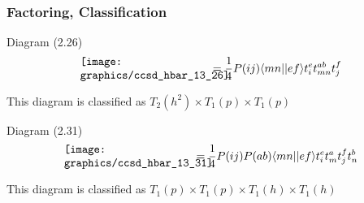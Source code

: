 \begin{frame}
    \frametitle{Factoring, Classification}

\begin{block}{Diagram (2.26)} 
    \begin{equation*}
        \parbox{40mm}{\texttt{[image: graphics/ccsd\_hbar\_13\_26]}}
        = \frac{1}{4} P(ij) \bra{mn}\ket{ef} t_i^e t_{mn}^{ab} t_j^f
    \end{equation*}
\end{block}
This diagram is classified as $T_2(h^2) \times T_1(p) \times T_1(p)$
\begin{block}{Diagram (2.31)} 
    \begin{equation*}
        \parbox{40mm}{\texttt{[image: graphics/ccsd\_hbar\_13\_31]}}
        = \frac{1}{4} P(ij) P(ab) \bra{mn}\ket{ef} t_i^e t_m^a t_j^f t_n^b
    \end{equation*}
\end{block}
This diagram is classified as $T_1(p) \times T_1(p) \times T_1(h) \times T_1(h)$
\end{frame}

